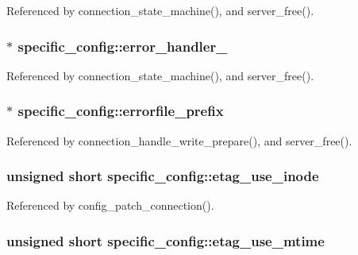 Referenced by connection\-\_\-state\-\_\-machine(), and server\-\_\-free().

\hypertarget{structspecific__config_a0fdc9709ac55069fd6303ab22bcfb5a6}{
\subsubsection[{error\-\_\-handler\-\_\-404}]{$\ast$ specific\-\_\-config\-::error\-\_\-handler\-\_}}\label{structspecific__config_a0fdc9709ac55069fd6303ab22bcfb5a6}


Referenced by connection\-\_\-state\-\_\-machine(), and server\-\_\-free().

\hypertarget{structspecific__config_ae6fb00722597cdbcb3a01c29eacf2f43}{
\subsubsection[{errorfile\-\_\-prefix}]{$\ast$ specific\-\_\-config\-::errorfile\-\_\-prefix}}\label{structspecific__config_ae6fb00722597cdbcb3a01c29eacf2f43}


Referenced by connection\-\_\-handle\-\_\-write\-\_\-prepare(), and server\-\_\-free().

\hypertarget{structspecific__config_a44e63f8a28706a74bd8b6c89e52a0158}{
\subsubsection[{etag\-\_\-use\-\_\-inode}]{\setlength{\rightskip}{0pt plus 5cm}unsigned short specific\-\_\-config\-::etag\-\_\-use\-\_\-inode}}\label{structspecific__config_a44e63f8a28706a74bd8b6c89e52a0158}


Referenced by config\-\_\-patch\-\_\-connection().

\hypertarget{structspecific__config_ac352c3fe57ceee2ca29dac31539cafb3}{
\subsubsection[{etag\-\_\-use\-\_\-mtime}]{\setlength{\rightskip}{0pt plus 5cm}unsigned short specific\-\_\-config\-::etag\-\_\-use\-\_\-mtime}}\label{structspecific__config_ac352c3fe57ceee2ca29dac31539cafb3}


